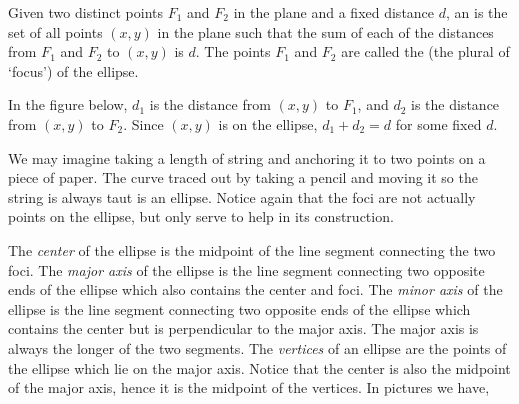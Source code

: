 \documentclass[nooutcomes]{ximera}
\begin{document}
\begin{definition}
Given two distinct points $F_{1}$ and $F_{2}$ in the plane and a fixed distance $d$, an    is the set of all points $(x, y)$ in the plane such that the sum of each of the distances from $F_{1}$ and $F_{2}$ to $(x, y)$ is $d$.  The points $F_{1}$ and $F_{2}$ are called the    (the plural of `focus') of the ellipse.
\end{definition}

In the figure below, $d_1$ is the distance from $(x, y)$ to $F_1$, and $d_2$ is the distance from $(x, y)$ to $F_2$. Since $(x, y)$ is on the ellipse, $d_1 + d_2 = d$ for some fixed $d$. 
\begin{image}
\end{image}


We may imagine taking a length of string and anchoring it to two points on a piece of paper.  The curve traced out by taking a pencil and moving it so the string is always taut is an ellipse. Notice again that the foci are not actually points on the ellipse, but only serve to help in its construction.

The   \emph {center} of the ellipse is the midpoint of the line segment connecting the two foci.  The   \emph{major axis} of the ellipse is the line segment connecting two opposite ends of the ellipse which also contains the center and foci.  The   \emph{minor axis} of the ellipse is the line segment connecting two opposite ends of the ellipse which contains the center but is perpendicular to the major axis. The major axis is always the longer of the two segments. The   \emph {vertices} of an ellipse are the points of the ellipse which lie on the major axis.  Notice that the center is also the midpoint of the major axis, hence it is the midpoint of the vertices.  In pictures we have,
\end{document}
